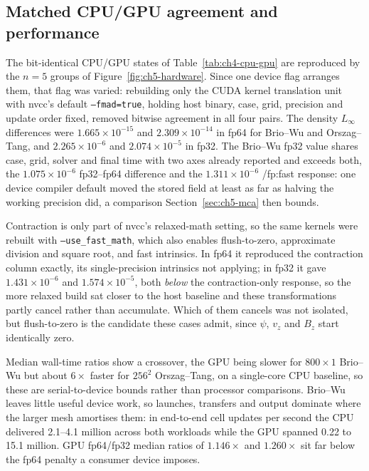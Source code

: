 \subsection{Matched CPU/GPU agreement and performance}
\label{sec:ch5-hardware}

The bit-identical CPU/GPU states of Table~\ref{tab:ch4-cpu-gpu} are reproduced
by the $n=5$ groups of Figure~\ref{fig:ch5-hardware}. Since one device flag
arranges them, that flag was varied: rebuilding only the CUDA kernel translation
unit with nvcc's default \texttt{--fmad=true}, holding host binary, case, grid,
precision and update order fixed, removed bitwise agreement in all four pairs.
The density $L_\infty$ differences were $1.665\times10^{-15}$ and
$2.309\times10^{-14}$ in fp64 for Brio--Wu and Orszag--Tang, and
$2.265\times10^{-6}$ and $2.074\times10^{-5}$ in fp32. The Brio--Wu fp32 value
shares case, grid, solver and final time with two axes already reported and
exceeds both, the $1.075\times10^{-6}$ fp32--fp64 difference and the
$1.311\times10^{-6}$ /fp:fast response: one device compiler default moved the
stored field at least as far as halving the working precision did, a comparison
Section~\ref{sec:ch5-mca} then bounds.

Contraction is only part of nvcc's relaxed-math setting, so the same kernels
were rebuilt with \texttt{--use\_fast\_math}, which also enables flush-to-zero,
approximate division and square root, and fast intrinsics. In
fp64 it reproduced the contraction column exactly, its single-precision
intrinsics not applying; in fp32 it gave $1.431\times10^{-6}$ and
$1.574\times10^{-5}$, both \emph{below} the contraction-only response, so the
more relaxed build sat closer to the host baseline and these transformations
partly cancel rather than accumulate. Which of them cancels was not isolated,
but flush-to-zero is the candidate these cases admit, since $\psi$, $v_z$ and
$B_z$ start identically zero.

Median wall-time ratios show a crossover, the GPU being slower for $800\times1$
Brio--Wu but about $6\times$ faster for $256^2$ Orszag--Tang, on a single-core
CPU baseline, so these are serial-to-device bounds rather than processor
comparisons. Brio--Wu leaves little useful device
work, so launches, transfers and output dominate where the larger mesh amortises
them: in end-to-end cell updates per second the CPU delivered 2.1--4.1 million
across both workloads while the GPU spanned 0.22 to 15.1 million. GPU fp64/fp32
median ratios of $1.146\times$ and $1.260\times$ sit far below the fp64 penalty
a consumer device imposes.

